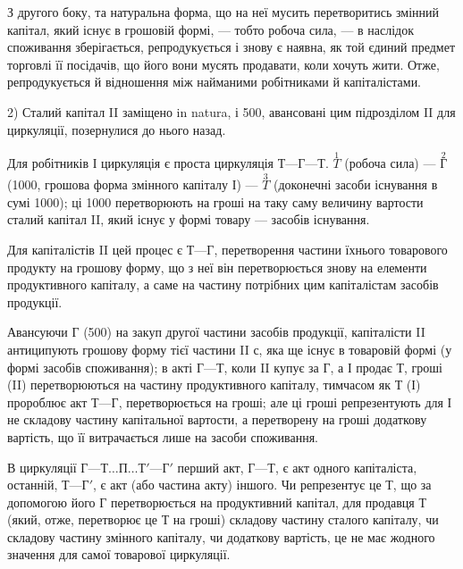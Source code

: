 З другого боку, та натуральна форма, що на неї мусить перетворитись
змінний капітал, який існує в грошовій формі, — тобто робоча сила, —
в наслідок споживання зберігається, репродукується і знову є наявна,
як той єдиний предмет торговлі її посідачів, що його вони мусять продавати,
коли хочуть жити. Отже, репродукується й відношення між найманими
робітниками й капіталістами.

2) Сталий капітал II заміщено in natura, і 500, авансовані
цим підрозділом II для циркуляції, позернулися до нього назад.

Для робітників І циркуляція є проста циркуляція $Т — Г — Т$. $\overset{1}{T}$ (робоча
сила) — $\overset{2}{Г}$ (1000, грошова форма змінного капіталу І) — $\overset{3}{T}$
(доконечні засоби існування в сумі 1000); ці 1000
перетворюють на гроші на таку саму величину вартости сталий капітал II,
який існує у формі товару — засобів існування.

Для капіталістів II цей процес є $Т — Г$, перетворення частини їхнього
товарового продукту на грошову форму, що з неї він перетворюється
знову на елементи продуктивного капіталу, а саме на частину потрібних
цим капіталістам засобів продукції.

Авансуючи $Г$ (500) на закуп другої частини засобів продукції,
капіталісти II антиципують грошову форму тієї частини II $с$, яка
ще існує в товаровій формі (у формі засобів споживання); в акті $Г — Т$,
коли II купує за $Г$, а І продає $Т$, гроші (II) перетворюються на частину
продуктивного капіталу, тимчасом як $Т$ (І) пророблює акт $Т — Г$, перетворюється
на гроші; але ці гроші репрезентують для І не складову частину
капітальної вартости, а перетворену на гроші додаткову вартість, що її
витрачається лише на засоби споживання.

В циркуляції $Г — Т\dots{} П\dots{} Т' — Г'$ перший акт, $Г — Т$, є акт одного капіталіста,
останній, $Т — Г'$, є акт (або частина акту) іншого. Чи репрезентує
це $Т$, що за допомогою його $Г$ перетворюється на продуктивний капітал,
для продавця $Т$ (який, отже, перетворює це $Т$ на гроші) складову частину
сталого капіталу, чи складову частину змінного капіталу, чи додаткову
вартість, це не має жодного значення для самої товарової циркуляції.


